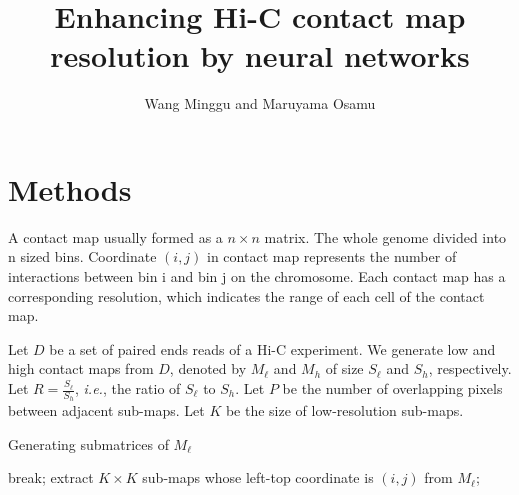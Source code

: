 \documentclass{article}
\begin{document}
\title{Enhancing Hi-C contact map resolution by neural networks}
\author{Wang Minggu and Maruyama Osamu}
\maketitle

%

\section{Methods}

A contact map usually formed as a $n \times n$ matrix. The whole genome divided into n sized bins. Coordinate $(i,j)$ in contact map represents the number of interactions between bin i and bin j on the chromosome. Each contact map has a corresponding resolution, which indicates the range of each cell of the contact map.


Let $D$ be a set of paired ends reads of a Hi-C experiment. 
We generate low and high contact maps from $D$, 
denoted by $M_\ell$ and $M_h$ of size $S_\ell$ and $S_h$, respectively.  
Let $R = \frac{S_\ell}{S_h}$, \textit{i.e.}, 
the ratio of $S_\ell$ to $S_h$.  
Let $P$ be the number of overlapping pixels between adjacent sub-maps.
Let $K$ be the size of low-resolution sub-maps.



\begin{algorithm}[htbp]
\caption{Generating submatrices of $M_\ell$}
\begin{algorithmic}
                \STATE break;
            \ELSE 
                \STATE extract $K \times K$ sub-maps whose left-top coordinate is $(i,j)$ from $M_\ell$;
            \ENDIF    
        \ENDFOR
    \ENDFOR
\end{algorithmic}
\end{algorithm}
\end{document}
